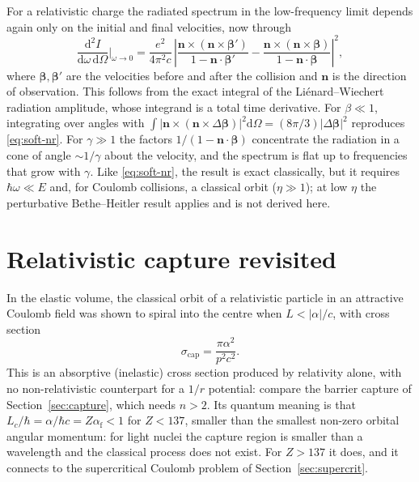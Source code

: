\documentclass[11pt,a4paper]{book}
\numberwithin{equation}{chapter}
\newcommand{\dd}{\mathrm{d}}
\newcommand{\afs}{\alpha_{\mathrm{f}}}
\begin{document}
For a relativistic charge the radiated spectrum in the low-frequency limit
depends again only on the initial and final velocities, now through
\begin{equation}\label{eq:rel-soft}
  \frac{\dd^2I}{\dd\omega\,\dd\Omega}\bigg|_{\omega\to0}=\frac{e^2}{4\pi^2c}\,
  \left|\frac{\bm n\times(\bm n\times\bm\beta')}{1-\bm n\cdot\bm\beta'}-
        \frac{\bm n\times(\bm n\times\bm\beta)}{1-\bm n\cdot\bm\beta}\right|^2 ,
\end{equation}
where $\bm\beta,\bm\beta'$ are the velocities before and after the collision and
$\bm n$ is the direction of observation. This follows from the exact integral of
the Li\'enard--Wiechert radiation amplitude, whose integrand is a total time
derivative. For $\beta\ll1$, integrating over angles with
$\int|\bm n\times(\bm n\times\Delta\bm\beta)|^2\dd\Omega=(8\pi/3)|\Delta\bm\beta|^2$
reproduces \eqref{eq:soft-nr}. For $\gamma\gg1$ the factors $1/(1-\bm n\cdot\bm\beta)$ concentrate the
radiation in a cone of angle $\sim1/\gamma$ about the velocity, and the spectrum
is flat up to frequencies that grow with $\gamma$. Like \eqref{eq:soft-nr}, the
result is exact classically, but it requires $\hbar\omega\ll E$ and, for Coulomb
collisions, a classical orbit ($\eta\gg1$); at low $\eta$ the perturbative
Bethe--Heitler result applies and is not derived here.

\section{Relativistic capture revisited}

In the elastic volume, the classical orbit of a relativistic particle in an
attractive Coulomb field was shown to spiral into the centre when
$L<|\alpha|/c$, with cross section
\begin{equation}\label{eq:rel-cap}
  \sigma_{\mathrm{cap}}=\frac{\pi\alpha^2}{p^2c^2}.
\end{equation}
This is an absorptive (inelastic) cross section produced by relativity alone,
with no non-relativistic counterpart for a $1/r$ potential: compare the barrier
capture of Section~\ref{sec:capture}, which needs $n>2$. Its quantum meaning is
that $L_c/\hbar=\alpha/\hbar c=Z\afs<1$ for $Z<137$, smaller than the smallest
non-zero orbital angular momentum: for light nuclei the capture region is smaller
than a wavelength and the classical process does not exist. For $Z>137$ it does,
and it connects to the supercritical Coulomb problem of Section~\ref{sec:supercrit}.
\end{document}
